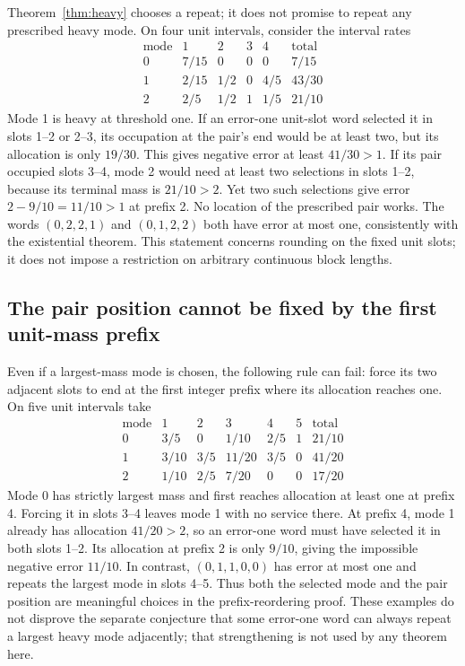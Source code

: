 Theorem~\ref{thm:heavy} chooses a repeat; it does not promise to repeat
any prescribed heavy mode. On four unit intervals, consider the interval
rates
\[
 \begin{array}{c|cccc|c}
 \text{mode}&1&2&3&4&\text{total}\\\hline
 0&7/15&0&0&0&7/15\\
 1&2/15&1/2&0&4/5&43/30\\
 2&2/5&1/2&1&1/5&21/10
 \end{array}
\]
Mode 1 is heavy at threshold one. If an error-one unit-slot word selected
it in slots 1--2 or 2--3, its occupation at the pair's end would be at
least two, but its allocation is only $19/30$. This gives negative error
at least $41/30>1$. If its pair occupied slots 3--4, mode 2 would need
at least two selections in slots 1--2, because its terminal mass is
$21/10>2$. Yet two such selections give error $2-9/10=11/10>1$ at
prefix 2. No location of the prescribed pair works. The words $(0,2,2,1)$
and $(0,1,2,2)$ both have error at most one, consistently with the
existential theorem. This statement concerns rounding on the fixed unit
slots; it does not impose a restriction on arbitrary continuous block
lengths.

\subsection{The pair position cannot be fixed by the first unit-mass prefix}

Even if a largest-mass mode is chosen, the following rule can fail: force
its two adjacent slots to end at the first integer prefix where its
allocation reaches one. On five unit intervals take
\[
 \begin{array}{c|ccccc|c}
 \text{mode}&1&2&3&4&5&\text{total}\\\hline
 0&3/5&0&1/10&2/5&1&21/10\\
 1&3/10&3/5&11/20&3/5&0&41/20\\
 2&1/10&2/5&7/20&0&0&17/20
 \end{array}
\]
Mode 0 has strictly largest mass and first reaches allocation at least
one at prefix 4. Forcing it in slots 3--4 leaves mode 1 with no service
there. At prefix 4, mode 1 already has allocation $41/20>2$, so an
error-one word must have selected it in both slots 1--2. Its allocation
at prefix 2 is only $9/10$, giving the impossible negative error
$11/10$. In contrast, $(0,1,1,0,0)$ has error at most one and repeats
the largest mode in slots 4--5. Thus both the selected mode and the pair
position are meaningful choices in the prefix-reordering proof. These
examples do not disprove the separate conjecture that some error-one
word can always repeat a largest heavy mode adjacently; that strengthening
is not used by any theorem here.
